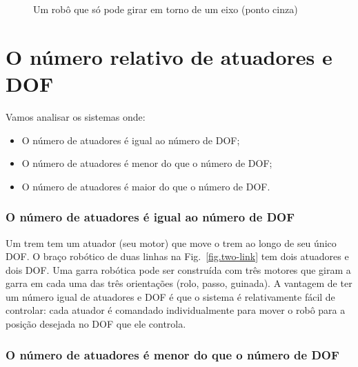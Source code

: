 {\begin{figure}
\begin{center}
\end{center}
\caption{Um robô que só pode girar em torno de um eixo (ponto cinza)}\label{fig.rot-dof}
\end{figure}

\section{O número relativo de atuadores e DOF}\label{s.num-actuators}

Vamos analisar os sistemas onde:
\begin{itemize}
\item O número de atuadores é igual ao número de DOF;
\item O número de atuadores é menor do que o número de DOF;
\item O número de atuadores é maior do que o número de DOF.
\end{itemize}

\subsubsection*{O número de atuadores é igual ao número de DOF}

Um trem tem um atuador (seu motor) que move o trem ao longo de seu único DOF. O braço robótico de duas linhas na Fig.~\ref{fig.two-link} tem dois atuadores e dois DOF. Uma garra robótica pode ser construída com três motores que giram a garra em cada uma das três orientações (rolo, passo, guinada). A vantagem de ter um número igual de atuadores e DOF é que o sistema é relativamente fácil de controlar: cada atuador é comandado individualmente para mover o robô para a posição desejada no DOF que ele controla.

\subsubsection*{O número de atuadores é menor do que o número de DOF}

}

